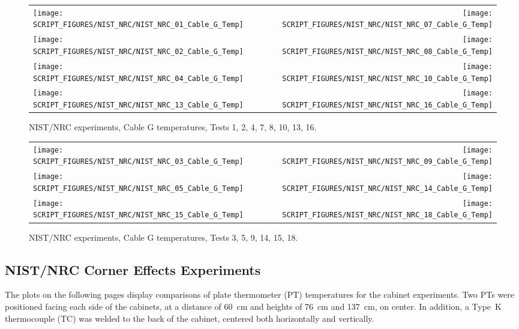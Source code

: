 \begin{figure}[p]
\begin{tabular*}{\textwidth}{l@{\extracolsep{\fill}}r}
\texttt{[image: SCRIPT\_FIGURES/NIST\_NRC/NIST\_NRC\_01\_Cable\_G\_Temp]} &
\texttt{[image: SCRIPT\_FIGURES/NIST\_NRC/NIST\_NRC\_07\_Cable\_G\_Temp]} \\
\texttt{[image: SCRIPT\_FIGURES/NIST\_NRC/NIST\_NRC\_02\_Cable\_G\_Temp]} &
\texttt{[image: SCRIPT\_FIGURES/NIST\_NRC/NIST\_NRC\_08\_Cable\_G\_Temp]} \\
\texttt{[image: SCRIPT\_FIGURES/NIST\_NRC/NIST\_NRC\_04\_Cable\_G\_Temp]} &
\texttt{[image: SCRIPT\_FIGURES/NIST\_NRC/NIST\_NRC\_10\_Cable\_G\_Temp]} \\
\texttt{[image: SCRIPT\_FIGURES/NIST\_NRC/NIST\_NRC\_13\_Cable\_G\_Temp]} &
\texttt{[image: SCRIPT\_FIGURES/NIST\_NRC/NIST\_NRC\_16\_Cable\_G\_Temp]}
\end{tabular*}
\caption{NIST/NRC experiments, Cable G temperatures, Tests 1, 2, 4, 7, 8, 10, 13, 16.}
\label{NIST_NRC_Cable_G_Closed}
\end{figure}

\begin{figure}[p]
\begin{tabular*}{\textwidth}{l@{\extracolsep{\fill}}r}
\texttt{[image: SCRIPT\_FIGURES/NIST\_NRC/NIST\_NRC\_03\_Cable\_G\_Temp]} &
\texttt{[image: SCRIPT\_FIGURES/NIST\_NRC/NIST\_NRC\_09\_Cable\_G\_Temp]} \\
\texttt{[image: SCRIPT\_FIGURES/NIST\_NRC/NIST\_NRC\_05\_Cable\_G\_Temp]} &
\texttt{[image: SCRIPT\_FIGURES/NIST\_NRC/NIST\_NRC\_14\_Cable\_G\_Temp]} \\
\texttt{[image: SCRIPT\_FIGURES/NIST\_NRC/NIST\_NRC\_15\_Cable\_G\_Temp]} &
\texttt{[image: SCRIPT\_FIGURES/NIST\_NRC/NIST\_NRC\_18\_Cable\_G\_Temp]}
\end{tabular*}
\caption{NIST/NRC experiments, Cable G temperatures, Tests 3, 5, 9, 14, 15, 18.}
\label{NIST_NRC_Cable_G_Open}
\end{figure}

\clearpage

\subsection{NIST/NRC Corner Effects Experiments}

The plots on the following pages display comparisons of plate thermometer (PT) temperatures for the cabinet experiments. Two PTs were positioned facing each side of the cabinets, at a distance of 60~cm and heights of 76~cm and 137~cm, on center. In addition, a Type~K thermocouple (TC) was welded to the back of the cabinet, centered both horizontally and vertically.

